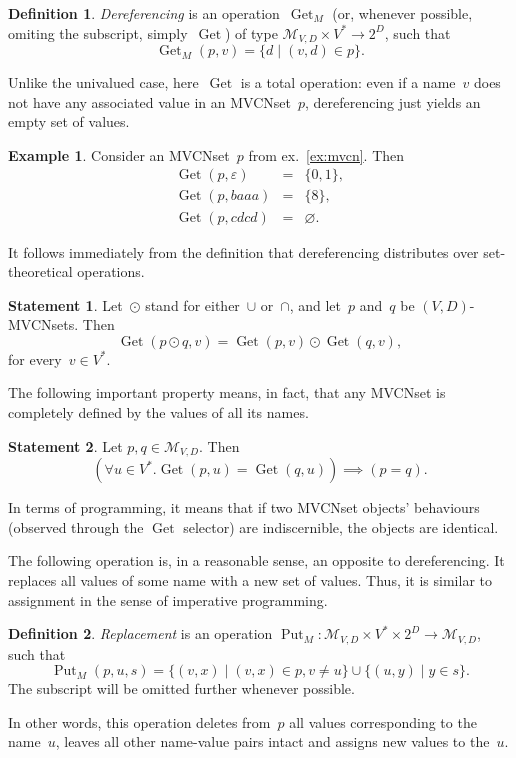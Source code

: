 \documentclass{article}
\theoremstyle{definition}
\newtheorem{Df}{Definition}
\newtheorem{St}{Statement}
\newtheorem{Ex}{Example}
\newcommand{\setcharmvcn}{M}
\newcommand{\setsymbol}[3]{\mathcal{#1}_{#2,#3}}
\newcommand{\setmvcn}[2]{\setsymbol{\setcharmvcn}{#1}{#2}}
\newcommand{\deref}{\operatorname{Get}}
\newcommand{\putval}{\operatorname{Put}}
\begin{document}
\begin{Df}\label{df:mvcn-dereferencing}
\emph{Dereferencing} is an operation~$\deref_\setcharmvcn$ (or, whenever
possible, omiting the subscript, simply~$\deref$) of type
$\setmvcn{V}{D} \times V^\ast \to 2^D$,
such that
\[
  \deref_\setcharmvcn(p, v) = \{ d \mid (v, d) \in p \} .
\]
\end{Df}

Unlike the univalued case, here~$\deref$ is a total operation: even if a
name~$v$ does not have any associated value in an MVCNset~$p$, dereferencing
just yields an empty set of values.

\begin{Ex}\label{ex:mvcn-dereferencing}
Consider an MVCNset~$p$ from ex.~\ref{ex:mvcn}. Then
\begin{eqnarray*}
  \deref(p, \varepsilon) & = & \{ 0, 1 \}, \\
  \deref(p, baaa)        & = & \{ 8 \}, \\
  \deref(p, cdcd)        & = & \varnothing .
\end{eqnarray*}

\end{Ex}

It follows immediately from the definition that dereferencing distributes
over set-theoretical operations.
\begin{St}\label{st:mvcn-deref-distributivity}
Let~$\odot$ stand for either~$\cup$ or~$\cap$, and let~$p$ and~$q$ be
$(V,D)$-MVCNsets. Then
\[
  \deref(p\odot q, v) = \deref(p, v) \odot \deref(q, v) ,
\]
for every~$v\in V^\ast$.
\end{St}

The following important property means, in fact, that any MVCNset is completely
defined by the values of all its names.
\begin{St}\label{st:mvcn-deref-equality}
Let $p, q \in \setmvcn{V}{D}$. Then
\[
  (\forall u\in V^\ast . \deref(p,u) = \deref(q,u)) \implies (p = q) .
\]
\end{St}
In terms of programming, it means that
if two MVCNset objects' behaviours (observed through the $\deref$ selector) are
indiscernible, the objects are identical.

The following operation is, in a reasonable sense, an opposite to
dereferencing.  It replaces all values of some name with a new set of values.
Thus, it is similar to assignment in the sense of imperative programming.
\begin{Df}\label{df:mvcn-replace}
\emph{Replacement} is an operation $\putval_\setcharmvcn : \setmvcn{V}{D}
\times V^\ast \times 2^D \to \setmvcn{V}{D}$, such that
\[
  \putval_\setcharmvcn(p, u, s) =
      \{ (v, x) \mid (v, x) \in p, v \neq u \} \cup
      \{ (u, y) \mid y \in s \} .
\]
The subscript will be omitted further whenever possible.
\end{Df}
In other words, this operation deletes from~$p$ all values corresponding to
the name~$u$, leaves all other name-value pairs intact and assigns new values
to the~$u$.
\end{document}
